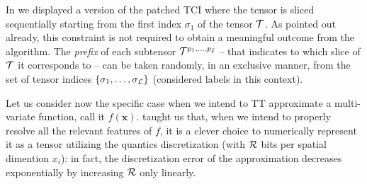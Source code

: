 In  we displayed a version of the patched TCI where the tensor is sliced sequentially starting from the first index $\sigma_1$ of the tensor $\mathcal{T}$. As pointed out already, this constraint is not required to obtain a meaningful outcome from the algorithm.
The \textit{prefix} of each subtensor $\mathcal{T}^{p_1,\dots,p_{\bar \ell}}$ -- that indicates to which slice of $\mathcal{T}$ it corresponds to -- can be taken randomly, in an exclusive manner, from the set of tensor indices $\{\sigma_1,\dots,\sigma_{\mathcal{L}}\}$ (considered labels in this context).

Let us consider now the specific case when we intend to TT approximate a multi-variate function, call it $f(\boldsymbol{x})$.  taught us that, when we intend to properly resolve all the relevant features of $f$, it is a clever choice to numerically represent it as a tensor utilizing the quantics discretization (with $\mathcal{R}$ bits per spatial dimention $x_i$): in fact, the discretization error of the approximation decreases exponentially by increasing $\mathcal{R}$ only linearly. 

